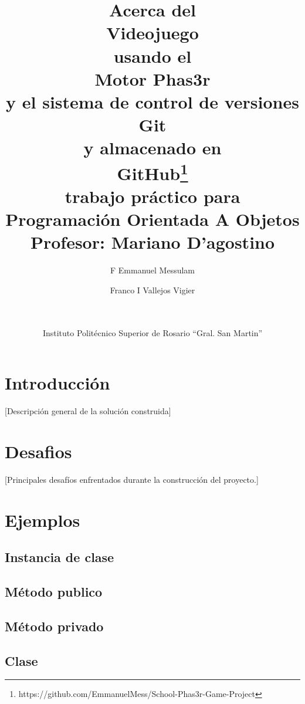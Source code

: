 \documentclass{article}
\title{\textbf{{\small Acerca del}\\
		Videojuego\\
		{\small usando el}\\
		Motor Phas3r\\
		{\small y el sistema de control de versiones}\\
		Git\\
		{\small y almacenado en}\\
		GitHub\footnote{https://github.com/EmmanuelMess/School-Phas3r-Game-Project}\\
		{\small trabajo práctico para}\\
		Programación Orientada A Objetos}\\
	Profesor: Mariano D'agostino}
\author{F Emmanuel Messulam\\
    \and Franco I Vallejos  Vigier\\
    \and \\\\
    Instituto Politécnico Superior de Rosario ``Gral. San Martin''}
\date{}
\newcommand{\insertverbbox}{{\addvbuffer[6pt 3pt]{\theverbbox}\par}}
\begin{document}
    \begin{titlepage}
        \maketitle
        \thispagestyle{empty}
    \end{titlepage}
    \section*{Introducción}   
    [Descripción general de la solución construida]
    
	\section*{Desafios}
    [Principales desafíos enfrentados durante la construcción del proyecto.]
    	
   	\section*{Ejemplos}
   	
    \subsection*{Instancia de clase}
    
    \begin{verbbox}
    	
    \end{verbbox}
    \insertverbbox

    \subsection*{Método publico}
    
    \begin{verbbox}

    \end{verbbox}
    \insertverbbox
    
   	\subsection*{Método privado}
   	
   	\begin{verbbox}
   		
   	\end{verbbox}
   	\insertverbbox
    
   	\subsection*{Clase}
   	
\end{document}
